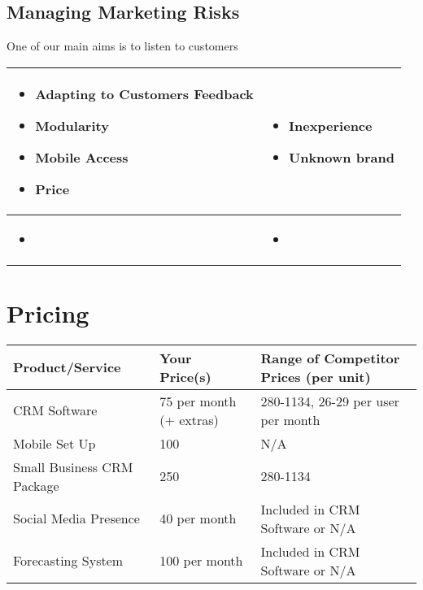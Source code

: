 \documentclass[DIV=calc, paper=a4, fontsize=11pt]{scrartcl}	 %
\begin{document}
\subsection{Managing Marketing Risks}
One of our main aims is to listen to customers 

\begin{tabular}{|p{}|p{}|} \hline
\begin{itemize}
\item Adapting to Customers Feedback
\item Modularity
\item Mobile Access
\item Price
\end{itemize} & 
\begin{itemize}
\item Inexperience
\item Unknown brand
\end{itemize}\\ \hline
\begin{itemize}
\item
\end{itemize} &
\begin{itemize}
\item
\end{itemize} \\ \hline
\end{tabular}

\section{Pricing}

\begin{tabular}{|l|l|l|} \hline
Product/Service    & Your Price(s) & Range of Competitor Prices (per unit) \\ \hline
CRM Software       & 75 per month (+ extras)  & 280-1134, 26-29 per user per month \\ \hline
Mobile Set Up      & 100           & N/A \\ \hline
Small Business CRM Package & 250   & 280-1134 \\ \hline
Social Media Presence & 40 per month & Included in CRM Software or N/A \\ \hline
Forecasting System & 100 per month & Included in CRM Software or N/A \\ \hline
\end{tabular}
\end{document}
